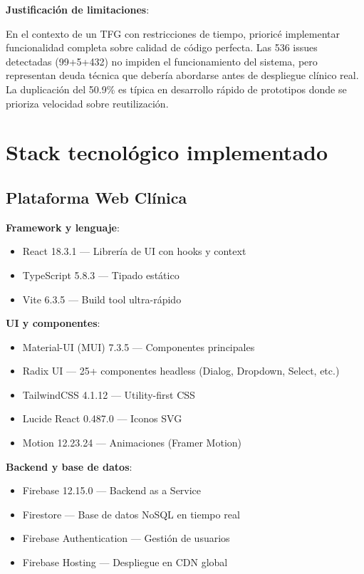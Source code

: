 \textbf{Justificación de limitaciones}:

En el contexto de un TFG con restricciones de tiempo, prioricé implementar funcionalidad completa sobre calidad de código perfecta. Las 536 issues detectadas (99+5+432) no impiden el funcionamiento del sistema, pero representan deuda técnica que debería abordarse antes de despliegue clínico real. La duplicación del 50.9\% es típica en desarrollo rápido de prototipos donde se prioriza velocidad sobre reutilización.

\section{Stack tecnológico implementado}

\subsection{Plataforma Web Clínica}

\textbf{Framework y lenguaje}:
\begin{itemize}
    \item React 18.3.1 — Librería de UI con hooks y context
    \item TypeScript 5.8.3 — Tipado estático
    \item Vite 6.3.5 — Build tool ultra-rápido
\end{itemize}

\textbf{UI y componentes}:
\begin{itemize}
    \item Material-UI (MUI) 7.3.5 — Componentes principales
    \item Radix UI — 25+ componentes headless (Dialog, Dropdown, Select, etc.)
    \item TailwindCSS 4.1.12 — Utility-first CSS
    \item Lucide React 0.487.0 — Iconos SVG
    \item Motion 12.23.24 — Animaciones (Framer Motion)
\end{itemize}

\textbf{Backend y base de datos}:
\begin{itemize}
    \item Firebase 12.15.0 — Backend as a Service
    \item Firestore — Base de datos NoSQL en tiempo real
    \item Firebase Authentication — Gestión de usuarios
    \item Firebase Hosting — Despliegue en CDN global
\end{itemize}

